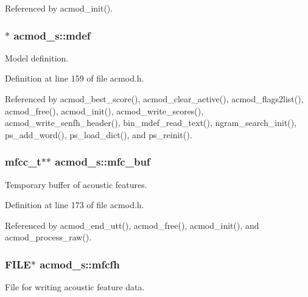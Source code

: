 \-Referenced by acmod\-\_\-init().

\subsubsection[{mdef}]{$\ast$ {\bf acmod\-\_\-s\-::mdef}}\label{structacmod__s_a351548ff5547c29b4a684e10434a51dd}


\-Model definition. 



\-Definition at line 159 of file acmod.\-h.



\-Referenced by acmod\-\_\-best\-\_\-score(), acmod\-\_\-clear\-\_\-active(), acmod\-\_\-flags2list(), acmod\-\_\-free(), acmod\-\_\-init(), acmod\-\_\-write\-\_\-scores(), acmod\-\_\-write\-\_\-senfh\-\_\-header(), bin\-\_\-mdef\-\_\-read\-\_\-text(), ngram\-\_\-search\-\_\-init(), ps\-\_\-add\-\_\-word(), ps\-\_\-load\-\_\-dict(), and ps\-\_\-reinit().

\subsubsection[{mfc\-\_\-buf}]{\setlength{\rightskip}{0pt plus 5cm}mfcc\-\_\-t$\ast$$\ast$ {\bf acmod\-\_\-s\-::mfc\-\_\-buf}}\label{structacmod__s_a5ded3dce0428a6ecba97b5d3486e7fa9}


\-Temporary buffer of acoustic features. 



\-Definition at line 173 of file acmod.\-h.



\-Referenced by acmod\-\_\-end\-\_\-utt(), acmod\-\_\-free(), acmod\-\_\-init(), and acmod\-\_\-process\-\_\-raw().

\subsubsection[{mfcfh}]{\setlength{\rightskip}{0pt plus 5cm}\-F\-I\-L\-E$\ast$ {\bf acmod\-\_\-s\-::mfcfh}}\label{structacmod__s_a71903df6839f1f9fcfc2ef2a62a94f8e}


\-File for writing acoustic feature data. 



